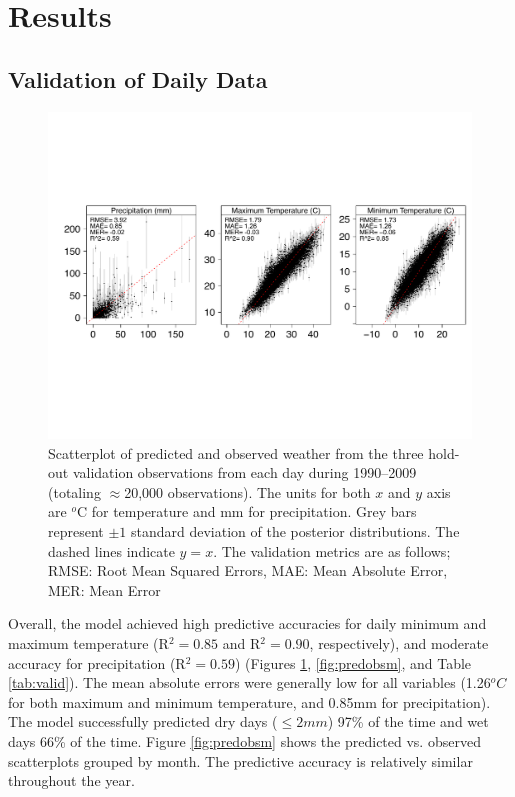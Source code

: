 \documentclass[12pt]{article}
\begin{document}
\section{Results}

\subsection{Validation of Daily Data}

%

\begin{figure}
  \begin{center}
 \includegraphics[clip=true,trim= 0 5.2mm 0 5.4mm,width=\textwidth]{Figure3.pdf} \caption{Scatterplot of
   predicted and observed weather from the three hold-out validation
   observations from each day during 1990--2009 (totaling
   $\approx$20,000 observations).  The units for both $x$ and $y$ axis
   are $^o$C for temperature and mm for precipitation.
   Grey bars represent $\pm1$ standard deviation of the posterior
   distributions. The dashed lines indicate $y=x$. 
   The validation metrics are as follows; RMSE: Root Mean Squared Errors, MAE: Mean Absolute Error, MER: Mean Error}
    \label{fig:predobs}
\end{center}
\end{figure}

Overall, the model achieved high predictive accuracies for
daily minimum and maximum temperature (R$^2=0.85$ and R$^2=0.90$,
respectively), and moderate accuracy for precipitation (R$^2=0.59$)
(Figures \ref{fig:predobs}, \ref{fig:predobsm}, and Table \ref{tab:valid}).
The mean absolute errors were generally low for all variables
(1.26$^oC$ for both maximum and minimum temperature,
and 0.85mm for precipitation).  The model successfully predicted dry
days ($\le2mm$) 97\% of the time and wet days 66\% of the time.
Figure \ref{fig:predobsm} shows the predicted vs. observed
scatterplots grouped by month.  The predictive accuracy is relatively
similar throughout the year.
\end{document}
